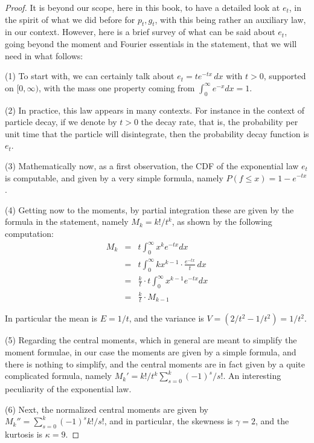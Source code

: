 \documentclass[12pt]{amsbook}
\begin{document}
\begin{proof}
It is beyond our scope, here in this book, to have a detailed look at $e_t$, in the spirit of what we did before for $p_t,g_t$, with this being rather an auxiliary law, in our context. However, here is a brief survey of what can be said about $e_t$, going beyond the moment and Fourier essentials in the statement, that we will need in what follows:

\medskip

(1) To start with, we can certainly talk about $e_t=te^{-tx}\,dx$ with $t>0$, supported on $[0,\infty)$, with the mass one property coming from $\int_0^\infty e^{-x}dx=1$.

\medskip

(2) In practice, this law appears in many contexts. For instance in the context of particle decay, if we denote by $t>0$ the decay rate, that is, the probability per unit time that the particle will disintegrate, then the probability decay function is $e_t$.

\medskip

(3) Mathematically now, as a first observation, the CDF of the exponential law $e_t$ is computable, and given by a very simple formula, namely $P(f\leq x)=1-e^{-tx}$.

\medskip

(4) Getting now to the moments, by partial integration these are given by the formula in the statement, namely $M_k=k!/t^k$, as shown by the following computation: 
\begin{eqnarray*}
M_k
&=&t\int_0^\infty x^ke^{-tx}dx\\
&=&t\int_0^\infty kx^{k-1}\cdot\frac{e^{-tx}}{t}\,dx\\
&=&\frac{k}{t}\cdot t\int_0^\infty x^{k-1}e^{-tx}dx\\
&=&\frac{k}{t}\cdot M_{k-1}
\end{eqnarray*}

In particular the mean is $E=1/t$, and the variance is $V=(2/t^2-1/t^2)=1/t^2$.

\medskip

(5) Regarding the central moments, which in general are meant to simplify the moment formulae, in our case the moments are given by a simple formula, and there is nothing to simplify, and the central moments are in fact given by a quite complicated formula, namely $M_k'=k!/t^k\sum_{s=0}^k(-1)^s/s!$. An interesting peculiarity of the exponential law.

\medskip

(6) Next, the normalized central moments are given by $M_k''=\sum_{s=0}^k(-1)^sk!/s!$, and in particular, the skewness is $\gamma=2$, and the kurtosis is $\kappa=9$.


\end{proof}
\end{document}
